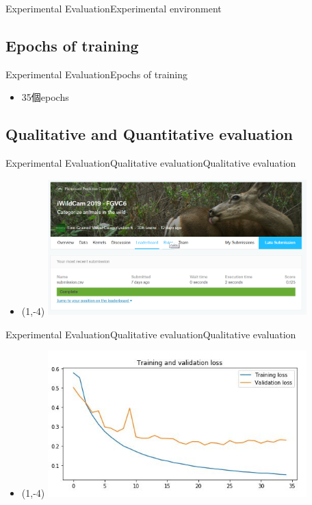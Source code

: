 \documentclass{beamer}
\begin{document}
\begin{CJK}{UTF8}{}
\begin{frame}{Experimental Evaluation}{Experimental environment}
\begin{itemize}
{	}
	\end{itemize}
\end{frame}

\subsection{Epochs of training}

\begin{frame}{Experimental Evaluation}{Epochs of training}
	\begin{itemize}
	\item{
		35個epochs
	}
	\end{itemize}
\end{frame}

\subsection{Qualitative and Quantitative evaluation}

\begin{frame}{Experimental Evaluation}{Qualitative evaluationQualitative evaluation}
	\begin{itemize}
	\item{
		\begin{textblock}{3}(1,-4)
		\includegraphics[width=10cm]{sorce.png}
		\end{textblock}
	}	
	\end{itemize}
\end{frame}

\begin{frame}{Experimental Evaluation}{Qualitative evaluationQualitative evaluation}
	\begin{itemize}
	\item{
		\begin{textblock}{3}(1,-4)
		\includegraphics[width=10cm]{loss.jpg}
		\end{textblock}
	}	
	\end{itemize}
\end{frame}


\end{CJK}
\end{document}
